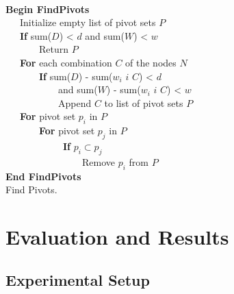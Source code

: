 \documentclass{tamuccthesis}
\begin{document}
\begin{algorithm}%
 \\
\textbf{Begin FindPivots}\\
~~~Initialize empty list of pivot sets $P$ \\
~~~\textbf{If} sum($D$) < $d$ and sum($W$) < $w$ \\
~~~~~~~Return $P$ \\
~~~\textbf{For} each combination $C$ of the nodes $N$ \\
~~~~~~~\textbf{If} sum($D$) - sum($w_i$ \forall $i$ \in $C$) < $d$ \\
~~~~~~~~~~~and sum($W$) - sum($w_i$ \forall $i$ \in $C$) < $w$ \\
~~~~~~~~~~~Append $C$ to list of pivot sets $P$ \\
~~~\textbf{For} pivot set $p_i$ in $P$ \\
~~~~~~~\textbf{For} pivot set $p_j$ in $P$ \\
~~~~~~~~~~~~\textbf{If} $p_i \subset p_j$ \\
~~~~~~~~~~~~~~~~Remove $p_i$ from $P$ \\
\textbf{End FindPivots}\\
\caption[Find Pivots.]{Find Pivots.} 
\label{alg:find_pivots}
\end{algorithm}


\chapter{Evaluation and Results}

\section{Experimental Setup}
\end{document}
